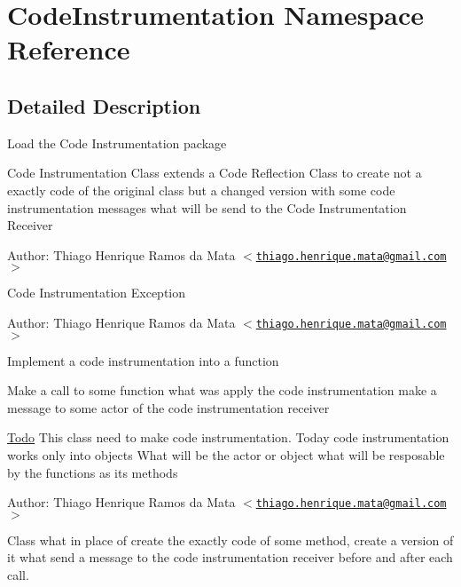 \hypertarget{namespace_code_instrumentation}{
\section{CodeInstrumentation Namespace Reference}
\label{namespace_code_instrumentation}
}


\subsection{Detailed Description}
Load the Code Instrumentation package

Code Instrumentation Class extends a Code Reflection Class to create not a exactly code of the original class but a changed version with some code instrumentation messages what will be send to the Code Instrumentation Receiver

\begin{Desc}
\item[Author:]Thiago Henrique Ramos da Mata $<$\href{mailto:thiago.henrique.mata@gmail.com}{\tt thiago.henrique.mata@gmail.com}$>$\end{Desc}
Code Instrumentation Exception

\begin{Desc}
\item[Author:]Thiago Henrique Ramos da Mata $<$\href{mailto:thiago.henrique.mata@gmail.com}{\tt thiago.henrique.mata@gmail.com}$>$\end{Desc}
Implement a code instrumentation into a function

Make a call to some function what was apply the code instrumentation make a message to some actor of the code instrumentation receiver

\begin{Desc}
\item[\hyperlink{todo__todo000001}{Todo}]This class need to make code instrumentation. Today code instrumentation works only into objects  What will be the actor or object what will be resposable by the functions as its methods\end{Desc}
\begin{Desc}
\item[Author:]Thiago Henrique Ramos da Mata $<$\href{mailto:thiago.henrique.mata@gmail.com}{\tt thiago.henrique.mata@gmail.com}$>$\end{Desc}
Class what in place of create the exactly code of some method, create a version of it what send a message to the code instrumentation receiver before and after each call.

